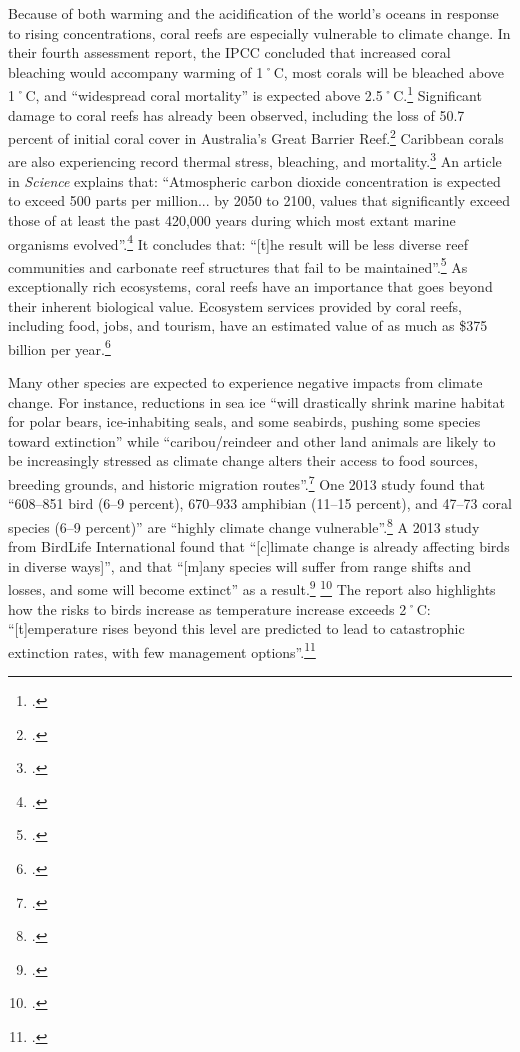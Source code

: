 Because of both warming and the acidification of the world's oceans in response to rising  concentrations, coral reefs are especially vulnerable to climate change.
In their fourth assessment report, the IPCC concluded that increased coral bleaching would accompany warming of 1˚C, most corals will be bleached above 1˚C, and ``widespread coral mortality'' is expected above 2.5˚C.\footcite[][p.51]{IPCCar4_syr}
Significant damage to coral reefs has already been observed, including the loss of 50.7 percent of initial coral cover in Australia's Great Barrier Reef.\footcite[][]{27declinecoral}
Caribbean corals are also experiencing record thermal stress, bleaching, and mortality.\footcite[][]{CaribbeanCorals}
An article in \emph{Science} explains that: ``Atmospheric carbon dioxide concentration is expected to exceed 500 parts per million... by 2050 to 2100, values that significantly exceed those of at least the past 420,000 years during which most extant marine organisms evolved''.\footcite[][p. 1737--1742]{CoralRapidCC}
It concludes that: ``[t]he result will be less diverse reef communities and carbonate reef structures that fail to be maintained''.\footcite[][p. 1737--1742]{CoralRapidCC}
As exceptionally rich ecosystems, coral reefs have an importance that goes beyond their inherent biological value.
Ecosystem services provided by coral reefs, including food, jobs, and tourism, have an estimated value of as much as \$375 billion per year.\footcite[][]{NOAACoral}



Many other species are expected to experience negative impacts from climate change.
For instance, reductions in sea ice ``will drastically shrink marine habitat for polar bears, ice-inhabiting seals, and some seabirds, pushing some species toward extinction'' while ``caribou/reindeer and other land animals are likely to be increasingly stressed as climate change alters their access to food sources, breeding grounds, and historic migration routes''.\footcite[][Executive summary, p. 10]{ACIA2004}
One 2013 study found that ``608–851 bird (6–9 percent), 670–933 amphibian (11–15 percent), and 47–73 coral species (6–9 percent)'' are ``highly climate change vulnerable''.\footcite[][p. 1]{VulnerableSpecies}
A 2013 study from BirdLife International found that ``[c]limate change is already affecting birds in diverse ways]'', and that ``[m]any species will suffer from range shifts and losses, and some will become extinct'' as a result.\footcite[][p. 15]{StateWorldBirds} \footcite[See also: ][]{CBCBirdLife}
The report also highlights how the risks to birds increase as temperature increase exceeds 2˚C: ``[t]emperature rises beyond this level are predicted to lead to catastrophic extinction rates, with few management options''.\footcite[][]{BirdLifeCC}



